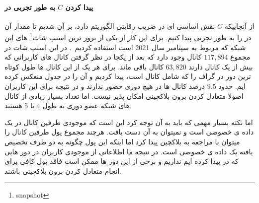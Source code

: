 \paragraph{پیدا کردن $C$
 به طور تجربی در  }
از آنجاییکه 
$C$
نقش اساسی ای در ضریب رقابتی الگوریتم \on دارد، بر آن شدیم تا مقدار آن در   را به طور تجربی پیدا کنیم. برای این کار از یکی از بروز ترین اسنپ شات\footnote{snapshot}
های این شبکه که مربوط به سپتامبر سال 2021 است استفاده کردیم~\cite{lngossip}.
در این اسنپ شات در مجموع $117,894$ کانال وجود دارد که بعد از یکجا در نظر گرفتن کانال های کاربرانی که بیش از یک کانال دارند
$63,820$
کانال باقی ماند. برای هر یک از این کانال ها طول کوتاه ترین دور در گراف را که شامل کانال است، پیدا کردیم و آن را در جدول  منعکس کرده ایم.
حدود  $9.5$ درصد کانال ها در هیچ دوری حضور ندارند و در نتیجه برای این کاربران اصولا متعادل کردن برون بلاکچینی امکان پذیر نیست.
اما تعداد بسیار زیادی از کانال های شبکه عضو دوری به طول 4 یا 5 هستند.\\



\begin{table}[htb!]
\begin{latin}
\centering
{}
\end{latin}
\end{table}

اما نکته بسیار مهمی که باید به آن توجه کرد این است که موجودی طرفین کانال در   یک داده ی خصوصی است و نمیتوان به آن دست یافت. هرچند مجموع پول طرفین کانال را میتوان با مراجعه به بلاکچین پیدا کرد اما اینکه این پول چگونه به دو طرف تخصیص یافته یک داده ی خصوصی است. در نتیجه ما اطلاعاتی از موجودی کاربران در دور هایی که در   پیدا کرده ایم نداریم و برخی از این دور ها ممکن است فاقد پول کافی برای انجام متعادل کردن برون بلاکچینی باشند.






